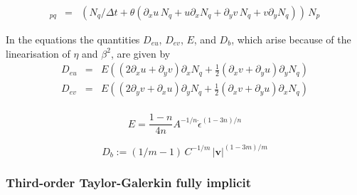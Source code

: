 \documentclass[10pt,a4paper]{book}
\newcommand{\p}{\partial}
\begin{document}
\begin{eqnarray} 
[\mathrm{K}^{hh}]_{pq} &=& (N_q/\Delta t 
+ \theta (\p_x u \, N_q + u \p_x N_q + \p_y v \, N_q + v \p_y N_q )) \, N_p
\nonumber 
\end{eqnarray}




In the equations the quantities $D_{eu}$, $D_{ev}$, $E$, and $D_b$, which arise because of the
linearisation of $\eta$ and $\beta^2$, are given by
\begin{eqnarray}
D_{eu} &=& E ((2 \p_x u + \p_y v) \p_x N_q + \frac{1}{2} (\p_x v + \p_y u) \p_y N_q )\\
D_{ev} &=& E ((2 \p_y v + \p_x u) \p_y N_q + \frac{1}{2} (\p_x v + \p_y u) \p_x N_q )\\
\end{eqnarray}

\[ 
   E= \frac{1-n}{4 n} A^{-1/n} \dot{\epsilon}^{(1-3n)/n}
\]

\[
D_b:=(1/m-1) \, C^{-1/m} \, |\bm{v}|^{(1-3m)/m}
\]



\subsubsection{Third-order Taylor-Galerkin fully implicit}
\end{document}
